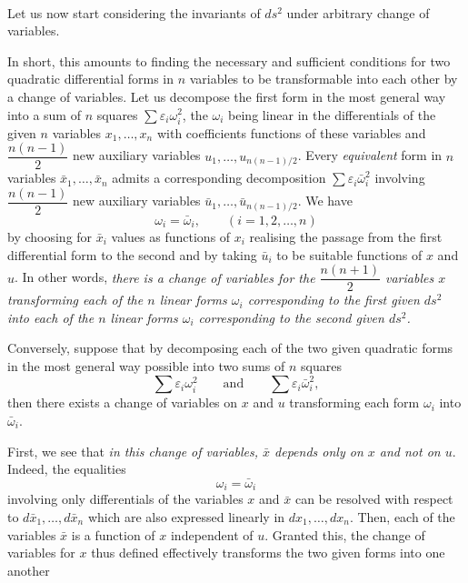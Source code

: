 \documentclass[leqno,12pt]{article}
\makeatletter
\let\old@epsilon\epsilon
\let\old@varepsilon\varepsilon
\let\epsilon\old@varepsilon
\let\varepsilon\old@epsilon
\theoremstyle{shape1}
\theoremstyle{shape0}
\theoremstyle{shape2}
\theoremstyle{definition}
\makeatother
\begin{document}
\paragraph{}
\label{sec:13}
Let us now start considering the invariants of $ds^{2}$ under arbitrary change of variables.

In short, this amounts to finding the necessary and sufficient conditions for two quadratic differential forms in $n$ variables to be transformable into each other by a change of variables. Let us decompose the first form in the most general way into a sum of $n$ squares $\sum\epsilon_{i}\omega_{i}^{2}$, the $\omega_{i}$ being linear in the differentials of the given $n$ variables $x_{1},\dots,x_{n}$ with coefficients functions of these variables and $\dfrac{n(n-1)}{2}$ new auxiliary variables $u_{1},\dots,u_{n(n-1)/2}$. Every \emph{equivalent} form in $n$ variables $\bar x_{1},\dots,\bar x_{n}$ admits a corresponding decomposition $\sum \epsilon_{i}\bar \omega_{i}^{2}$ involving $\dfrac{n(n-1)}{2}$ new auxiliary variables $\bar u_{1},\dots,\bar u_{n(n-1)/2}$. We have
\[
\omega_{i}=\bar \omega_{i},\qquad (i=1,2,\dots,n)
\]
by choosing for $\bar x_{i}$ values as functions of $x_{i}$ realising the passage from the first differential form to the second and by taking $\bar u_{i}$ to be suitable functions of $x$ and $u$. In other words, \emph{there is a change of variables for the $\dfrac{n(n+1)}{2}$ variables $x$ transforming each of the $n$ linear forms $\omega_{i}$ corresponding to the first given $ds^{2}$ into each of the $n$ linear forms $\omega_{i}$ corresponding to the second given $ds^{2}$.}

Conversely, suppose that by decomposing each of the two given quadratic forms in the most general way possible into two sums of $n$ squares
\[
\sum\epsilon_{i}\omega_{i}^{2}\qquad\text{and}\qquad\sum\epsilon_{i}\bar\omega_{i}^{2},
\]
then there exists a change of variables on $x$ and $u$ transforming each form $\omega_{i}$ into $\bar\omega_{i}$.

First, we see that \emph{in this change of variables, $\bar x$ depends only on $x$ and not on $u$}. Indeed, the equalities
\[
\omega_{i}=\bar\omega_{i}
\]
involving only differentials of the variables $x$ and $\bar x$ can be resolved with respect to $d\bar x_{1},\dots, d\bar x_{n}$ which are also expressed linearly in $dx_{1},\dots,dx_{n}$. Then, each of the variables $\bar x$ is a function of $x$ independent of $u$. Granted this, the change of variables for $x$ thus defined effectively transforms the two given forms into one another
\end{document}
